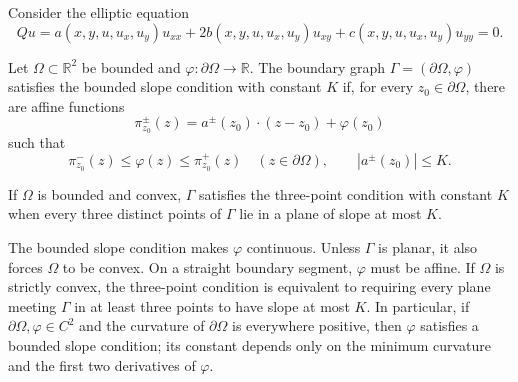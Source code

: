 Consider the elliptic equation
\begin{equation}\tag{12.40}
Qu=a(x,y,u,u_x,u_y)u_{xx}
+2b(x,y,u,u_x,u_y)u_{xy}
+c(x,y,u,u_x,u_y)u_{yy}=0.
\end{equation}

\begin{definition}
\label{gt-ch12-def-bounded-slope}
Let $\Omega\subset\mathbb R^2$ be bounded and
$\varphi:\partial\Omega\to\mathbb R$.  The boundary graph
$\Gamma=(\partial\Omega,\varphi)$ satisfies the bounded slope condition with
constant $K$ if, for every $z_0\in\partial\Omega$, there are affine functions
\[
\pi_{z_0}^\pm(z)
=a^\pm(z_0)\cdot(z-z_0)+\varphi(z_0)
\]
such that
\begin{equation}\tag{12.41}
\pi_{z_0}^-(z)\le\varphi(z)\le\pi_{z_0}^+(z)
\quad(z\in\partial\Omega),
\qquad
|a^\pm(z_0)|\le K.
\end{equation}
\end{definition}

\begin{definition}
\label{gt-ch12-def-three-point}
If $\Omega$ is bounded and convex, $\Gamma$ satisfies the three-point
condition with constant $K$ when every three distinct points of $\Gamma$ lie
in a plane of slope at most $K$.
\end{definition}

The bounded slope condition makes $\varphi$ continuous.  Unless $\Gamma$ is
planar, it also forces $\Omega$ to be convex.  On a straight boundary
segment, $\varphi$ must be affine.  If $\Omega$ is strictly convex, the
three-point condition is equivalent to requiring every plane meeting
$\Gamma$ in at least three points to have slope at most $K$.  In particular,
if $\partial\Omega,\varphi\in C^2$ and the curvature of $\partial\Omega$ is
everywhere positive, then $\varphi$ satisfies a bounded slope condition; its
constant depends only on the minimum curvature and the first two derivatives
of $\varphi$.

